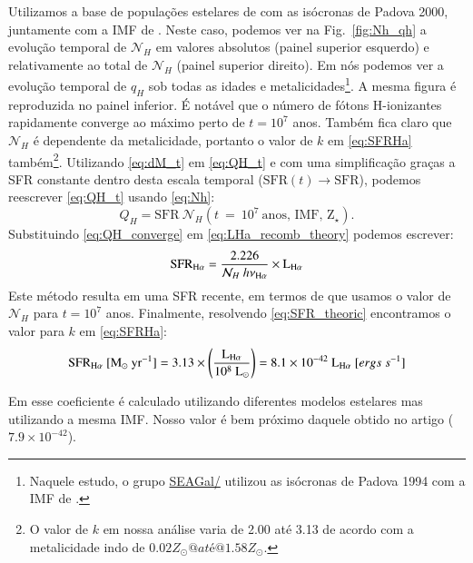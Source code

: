 Utilizamos a base de populações estelares de \citet{BC03a} com as isócronas de Padova 2000,
juntamente com a IMF de \citet{Salpeter.1955a}. Neste caso, podemos ver na Fig.\ \ref{fig:Nh_qh} a
evolução temporal de $\mathcal{N}_H$ em valores absolutos (painel superior esquerdo) e relativamente
ao total de $\mathcal{N}_H$ (painel superior direito). Em \citet[Fig. 2b]{CidFernandes.etal.2011a}
nós podemos ver a evolução temporal de $q_H$ sob todas as idades e metalicidades\footnote{Naquele
estudo, o grupo \href{http://starlight.ufsc.br}{SEAGal/\STARLIGHT} utilizou as isócronas de Padova
1994 com a IMF de \citet{Chabrier.2003a}.}. A mesma figura é reproduzida no painel inferior. É
notável que o número de fótons H-ionizantes rapidamente converge ao máximo perto de $t = 10^7$ anos.
Também fica claro que $\mathcal{N}_H$ é dependente da metalicidade, portanto o valor de $k$ em
\eqref{eq:SFRHa} também\footnote{O valor de $k$ em nossa análise varia de 2.00 até 3.13 de
acordo com a metalicidade indo de $0.02 Z_\odot@ até @1.58 Z_\odot$.}. Utilizando \eqref{eq:dM_t}
em \eqref{eq:QH_t} e com uma simplificação graças a SFR constante dentro desta escala temporal
($\mathrm{SFR}(t)\rightarrow \mathrm{SFR}$), podemos reescrever \eqref{eq:QH_t} usando
\eqref{eq:Nh}:
\begin{equation}
	Q_H = \mathrm{SFR}\ \mathcal{N}_H(t\ =\ 10^7\ \textrm{anos, IMF, Z}{}_\star).
	\label{eq:QH_converge}
\end{equation}
\noindent Substituindo \eqref{eq:QH_converge} em \eqref{eq:LHa_recomb_theory} podemos escrever:
\begin{equation}
	\mathrm{SFR}_{\Halpha} = \frac{2.226}{\mathcal{N}_H\ h \nu_{\Halpha}} \times \LHalpha
	\label{eq:SFR_theoric}
\end{equation}
\noindent Este método resulta em uma SFR recente, em termos de que usamos o valor de $\mathcal{N}_H$
para $t = 10^7$ anos. Finalmente, resolvendo \eqref{eq:SFR_theoric} encontramos o valor para $k$ em
\eqref{eq:SFRHa}:
\begin{equation}
	\mathrm{SFR}_{\Halpha}\ [\mathrm{M}_\odot\ \mathrm{yr}^{-1}] = 3.13 \times
	\left(\frac{\LHalpha}{10^8\ \mathrm{L}_\odot}\right) = 8.1 \times 10^{-42}\ \LHalpha\ [ergs\ s^{-1}]
	\label{eq:SFRNeb}
\end{equation}

Em \citet{Kennicutt.1998a} esse coeficiente é calculado utilizando diferentes modelos estelares mas
utilizando a mesma IMF. Nosso valor é bem próximo daquele obtido no artigo ($7.9 \times 10^{-42}$). 

